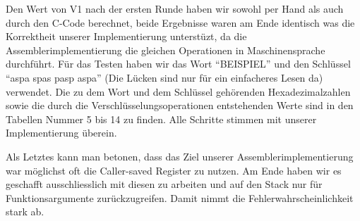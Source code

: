 \documentclass[course=asp]{aspdoc}
\begin{document}
Den Wert von V1 nach der ersten Runde haben wir sowohl per Hand als auch durch den C-Code berechnet, beide Ergebnisse waren am Ende identisch was die Korrektheit unserer Implementierung unterstüzt, da die Assemblerimplementierung die gleichen Operationen in Maschinensprache durchführt. Für das Testen haben wir das Wort ``BEISPIEL'' und den Schlüssel ``aspa spas pasp aspa'' (Die Lücken sind nur für ein einfacheres Lesen da)
verwendet. Die zu dem Wort und dem Schlüssel gehörenden Hexadezimalzahlen sowie die durch die Verschlüsselungsoperationen entstehenden Werte sind in den Tabellen Nummer 5 bis 14 zu finden. Alle Schritte stimmen mit unserer Implementierung überein.

Als Letztes kann man betonen, dass das Ziel unserer Assemblerimplementierung war möglichst oft die Caller-saved Register zu nutzen.  Am Ende haben wir es geschafft ausschliesslich mit diesen zu arbeiten und auf den Stack nur für Funktionsargumente zurückzugreifen. Damit nimmt die Fehlerwahrscheinlichkeit stark ab.
\newpage
\end{document}
